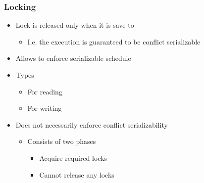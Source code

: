 \subsubsection{Locking}
\begin{itemize}
     Do not know what transactions are going to do in the future
     Before the system access the data object $X$ it locks $X$
        \begin{itemize}
            \item Prevents access of $X$ by other transaction
        \end{itemize}
    \item Lock is released only when it is save to
        \begin{itemize}
            \item I.e. the execution is guaranteed to be conflict serializable
        \end{itemize}
    \item Allows to enforce serializable schedule
    \item Types
        \begin{itemize}
                \begin{itemize}
                    \item For reading
                \end{itemize}
                \begin{itemize}
                    \item For writing
                \end{itemize}
        \end{itemize}
    \item Does not necessarily enforce conflict serializability
        \begin{itemize}
            \item Consists of two phases
                \begin{itemize}
                        \begin{itemize}
                            \item Acquire required locks
                            \item Cannot release any locks
                        \end{itemize}
                        \begin{itemize}

\end{itemize}
\end{itemize}
\end{itemize}
\end{itemize}
